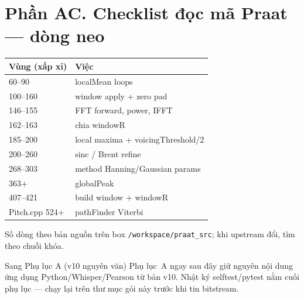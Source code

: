 \newpage\section*{Phần AC. Checklist đọc mã Praat --- dòng neo}
\begin{center}\small\begin{tabular}{@{}p{2.2cm}p{9cm}@{}}
\toprule Vùng (xấp xỉ) & Việc \\
\midrule
60--90 & localMean loops \\
100--160 & window apply + zero pad \\
146--155 & FFT forward, power, IFFT \\
162--163 & chia windowR \\
185--200 & local maxima + voicingThreshold/2 \\
200--260 & sinc / Brent refine \\
268--303 & method Hanning/Gaussian params \\
363+ & globalPeak \\
407--421 & build window + windowR \\
Pitch.cpp 524+ & pathFinder Viterbi \\
\bottomrule
\end{tabular}\end{center}
Số dòng theo bản nguồn trên box \texttt{/workspace/praat\_src}; khi upstream đổi, tìm theo chuỗi khóa.


\newpage
\begin{firstprin}{Sang Phụ lục A (v10 nguyên văn)}
Phụ lục~A ngay sau đây giữ nguyên nội dung ứng dụng Python/Whisper/Pearson từ bản v10.
Nhật ký selftest/pytest nằm cuối phụ lục --- chạy lại trên thư mục gói này trước khi tin bitstream.
\end{firstprin}
